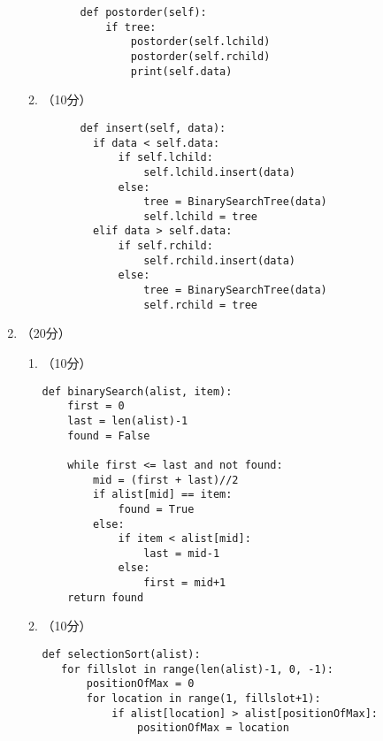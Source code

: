 \documentclass[8pt]{article}
\newlength{\la}
\newlength{\lc}
\newlength{\ld}
\begin{document}
\begin{CJK}{UTF8}{gkai}
\begin{enumerate}
\begin{enumerate}
\begin{lstlisting}
      def postorder(self):
          if tree:
              postorder(self.lchild)
              postorder(self.rchild)
              print(self.data)
    \end{lstlisting}
  \item （10分）~
    \begin{lstlisting}
      def insert(self, data):
        if data < self.data:
            if self.lchild:
                self.lchild.insert(data)
            else:
                tree = BinarySearchTree(data)
                self.lchild = tree
        elif data > self.data:
            if self.rchild:
                self.rchild.insert(data)
            else:
                tree = BinarySearchTree(data)
                self.rchild = tree
      \end{lstlisting}
  \end{enumerate}
\item （20分）~
  \begin{enumerate}
  \item （10分）~
    \begin{lstlisting}
def binarySearch(alist, item):
    first = 0
    last = len(alist)-1
    found = False
    
    while first <= last and not found:
        mid = (first + last)//2
        if alist[mid] == item:
            found = True
        else:
            if item < alist[mid]:
                last = mid-1
            else:
                first = mid+1
    return found
  \end{lstlisting}
  \item （10分）
    \begin{lstlisting}
def selectionSort(alist):
   for fillslot in range(len(alist)-1, 0, -1):
       positionOfMax = 0
       for location in range(1, fillslot+1):
           if alist[location] > alist[positionOfMax]:
               positionOfMax = location


\end{lstlisting}
\end{enumerate}
\end{enumerate}
\end{CJK}
\end{document}
